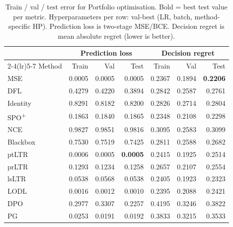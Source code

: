 \begin{table}[t]
\centering
\caption[Train/val/test error for Portfolio optimisation.]{Train / val / test error for Portfolio optimisation. Bold = best test value per metric. Hyperparameters per row: val-best (LR, batch, method-specific HP). Prediction loss is two-stage MSE/BCE. Decision regret is mean absolute regret (lower is better).}
\label{tab:err-portfolio}
\setlength{\tabcolsep}{4pt}
\renewcommand{\arraystretch}{1.05}
\begin{tabular}{@{}lrrrrrr@{}}
\toprule
& \multicolumn{3}{c}{Prediction loss} & \multicolumn{3}{c}{Decision regret} \\
\cmidrule(lr){2-4}\cmidrule(lr){5-7}
Method & Train & Val & Test & Train & Val & Test \\
\midrule
MSE & 0.0005 & 0.0005 & 0.0005 & 0.2367 & 0.1894 & \textbf{0.2206} \\
DFL & 0.4279 & 0.4220 & 0.3894 & 0.2842 & 0.2587 & 0.2761 \\
Identity & 0.8291 & 0.8182 & 0.8200 & 0.2826 & 0.2714 & 0.2804 \\
SPO\textsuperscript{+} & 0.1863 & 0.1840 & 0.1865 & 0.2348 & 0.2108 & 0.2298 \\
NCE & 0.9827 & 0.9851 & 0.9816 & 0.3095 & 0.2583 & 0.3099 \\
Blackbox & 0.7530 & 0.7519 & 0.7425 & 0.2811 & 0.2588 & 0.2682 \\
ptLTR & 0.0006 & 0.0005 & \textbf{0.0005} & 0.2415 & 0.1925 & 0.2514 \\
prLTR & 0.1293 & 0.1234 & 0.1258 & 0.2657 & 0.2107 & 0.2554 \\
lsLTR & 0.0538 & 0.0568 & 0.0538 & 0.2405 & 0.1923 & 0.2323 \\
LODL & 0.0016 & 0.0012 & 0.0010 & 0.2395 & 0.2088 & 0.2421 \\
DPO & 0.2977 & 0.3307 & 0.2257 & 0.4195 & 0.3246 & 0.3822 \\
PG & 0.0253 & 0.0191 & 0.0192 & 0.3833 & 0.3215 & 0.3533 \\
\bottomrule
\end{tabular}
\end{table}
